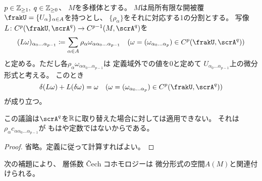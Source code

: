 \documentclass[report]{jlreq}
\begin{document}
\begin{lemma}
    $p \in \mathbb{Z}_{\ge 1}, \; q \in \mathbb{Z}_{\ge 0}$、
    $M$を多様体とする。
    $M$は局所有限な開被覆$\frakU = \{U_\alpha\}_{\alpha \in A}$を持つとし、
    $\{ \rho_\alpha \}$をそれに対応する1の分割とする。
    写像$L \colon C^p(\frakU, \scrA^q) \to C^{p - 1}(M, \scrA^q)$を
    \begin{equation}
        (L\omega)_{\alpha_0 \dots \alpha_{p - 1}}
            \coloneqq
            \sum_{\alpha \in A}
            \rho_\alpha
            \omega_{\alpha \alpha_0 \dots \alpha_{p - 1}}
            \quad
            (\omega = (\omega_{\alpha_0 \dots \alpha_p})
            \in C^p(\frakU, \scrA^q))
    \end{equation}
    と定める。ただし各$\rho_\alpha \omega_{\alpha \alpha_0 \dots \alpha_{p - 1}}$は
    定義域外での値を$0$と定めて
    $U_{\alpha_0 \dots \alpha_{p - 1}}$上の微分形式と考える。
    このとき
    \begin{equation}
        \delta(L \omega) + L(\delta \omega) = \omega
            \quad
            (\omega = (\omega_{\alpha_0 \dots \alpha_p})
            \in C^p(\frakU, \scrA^q))
    \end{equation}
    が成り立つ。
\end{lemma}

\begin{remark}
    この議論は$\scrA^q$を$\mathbb{R}$に取り替えた場合に対しては適用できない。
    それは$\rho_\alpha c_{\alpha \alpha_0 \dots \alpha_{p - 1}}$が
    もはや定数ではないからである。
\end{remark}

\begin{proof}
    省略。定義に従って計算すればよい。
\end{proof}

次の補題により、
層係数 \v{C}ech コホモロジーは
微分形式の空間$A(M)$と関連付けられる。

\end{document}
